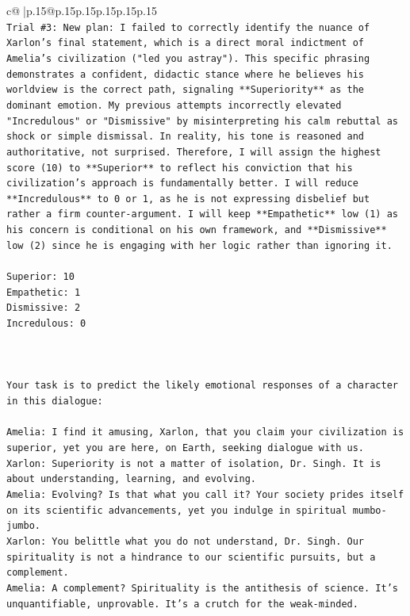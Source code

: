 \documentclass{article}
\begin{document}
{\begin{supertabular}{c@{$\;$}|p{.15\linewidth}@{}p{.15\linewidth}p{.15\linewidth}p{.15\linewidth}p{.15\linewidth}p{.15\linewidth}}
{{{\\ 
\texttt{Trial \#3: New plan: I failed to correctly identify the nuance of Xarlon's final statement, which is a direct moral indictment of Amelia's civilization ("led you astray"). This specific phrasing demonstrates a confident, didactic stance where he believes his worldview is the correct path, signaling **Superiority** as the dominant emotion. My previous attempts incorrectly elevated "Incredulous" or "Dismissive" by misinterpreting his calm rebuttal as shock or simple dismissal. In reality, his tone is reasoned and authoritative, not surprised. Therefore, I will assign the highest score (10) to **Superior** to reflect his conviction that his civilization's approach is fundamentally better. I will reduce **Incredulous** to 0 or 1, as he is not expressing disbelief but rather a firm counter{-}argument. I will keep **Empathetic** low (1) as his concern is conditional on his own framework, and **Dismissive** low (2) since he is engaging with her logic rather than ignoring it.} \\
\\ 
\texttt{Superior: 10} \\
\texttt{Empathetic: 1} \\
\texttt{Dismissive: 2} \\
\texttt{Incredulous: 0} \\
\\ 
\\ 
\\ 
\texttt{Your task is to predict the likely emotional responses of a character in this dialogue:} \\
\\ 
\texttt{Amelia: I find it amusing, Xarlon, that you claim your civilization is superior, yet you are here, on Earth, seeking dialogue with us.} \\
\texttt{Xarlon: Superiority is not a matter of isolation, Dr. Singh. It is about understanding, learning, and evolving.} \\
\texttt{Amelia: Evolving? Is that what you call it? Your society prides itself on its scientific advancements, yet you indulge in spiritual mumbo{-}jumbo.} \\
\texttt{Xarlon: You belittle what you do not understand, Dr. Singh. Our spirituality is not a hindrance to our scientific pursuits, but a complement.} \\
\texttt{Amelia: A complement? Spirituality is the antithesis of science. It's unquantifiable, unprovable. It's a crutch for the weak{-}minded.} \\
}}}
\end{supertabular}}
\end{document}
